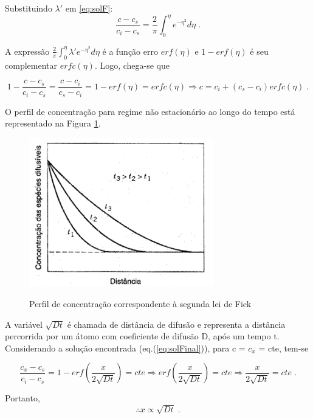 \documentclass[]{politex}
\begin{document}
Substituindo $\lambda'$ em \autoref{eq:solF}:
\begin{equation} \label{eq:solG}
	\frac{c - c_s}{c_i - c_s} = \frac{2}{\pi} \int_{0}^{\eta} e^{-\eta^2} d\eta   \;.
\end{equation}

A expressão $ \frac{2}{\pi} \int_{0}^{\eta} \lambda'e^{-\eta^2} d\eta $ é a função erro $erf(\eta)$ e  $1 - erf(\eta)$ é seu complementar $erfc(\eta)$. Logo, chega-se que 

\begin{equation} \label{eq:solFinal}
	1 - \frac{c - c_s}{c_i - c_s} = \frac{c - c_i}{c_s - c_i} = 1 - erf(\eta) = erfc(\eta) \Rightarrow c = c_i + (c_s - c_i) erfc(\eta) \;.
\end{equation}

\par O perfil de concentração para regime não estacionário ao longo do tempo está representado na Figura \ref{fig:segundaLei}.

\begin{figure}[ht]
	\caption{Perfil de concentração correspondente à segunda lei de Fick}
	\includegraphics[width=80mm,scale=0.5]{segundaLei}
	\label{fig:segundaLei}
	\centering
\end{figure}

\FloatBarrier

\par
	A variável $\sqrt{Dt}$ é chamada de distância de difusão e representa a distância percorrida por um átomo com coeficiente de difusão D, após um tempo t. Considerando a solução encontrada (eq.(\ref{eq:solFinal})), para c =  $c_x$ = cte, tem-se

$$\frac{c_x - c_s}{c_i - c_s} = 1 - erf(\frac{x}{2\sqrt{Dt}}) = cte \Rightarrow erf(\frac{x}{2\sqrt{Dt}}) = cte \Rightarrow \frac{x}{2\sqrt{Dt}} = cte \;.$$ 

Portanto, 
\begin{equation} \label{eq:difdist}
		\therefore x \propto  \sqrt{Dt} \;.
\end{equation}
\end{document}

